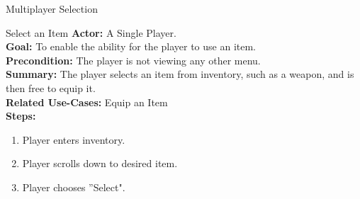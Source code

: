 \documentclass[12pt]{report}
\begin{document}
\begin{subsection}{Multiplayer Selection}
\begin{subsection}{Select an Item}
\textbf{Actor:} A Single Player. \\
\textbf{Goal:} To enable the ability for the player to use an item. \\
\textbf{Precondition:} The player is not viewing any other menu. \\
\textbf{Summary:} The player selects an item from inventory, such as a weapon, and is then free to equip it. \\
\textbf{Related Use-Cases:} Equip an Item \\
\textbf{Steps:}
\begin{enumerate}
   \item Player enters inventory.
   \item Player scrolls down to desired item.
   \item Player chooses ''Select".
\end{enumerate}
\end{subsection}



\end{subsection}
\end{document}
